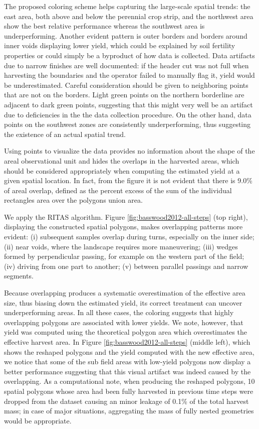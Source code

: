  The proposed coloring scheme helps
capturing the large-scale spatial trends: the east area, both above
and below the perennial crop strip, and the northwest area show the
best relative performance whereas the southwest area is
underperforming. Another evident pattern is outer borders and borders
around inner voids displaying lower yield, which could be explained by
soil fertility properties or could simply be a byproduct of how data
is collected. Data artifacts due to narrow finishes are well
documented: if the header cut was not full when harvesting the
boundaries and the operator failed to manually flag it, yield would be
underestimated. Careful consideration should be given to neighboring
points that are not on the borders. Light green points on the northern
borderline are adjacent to dark green points, suggesting that this
might very well be an artifact due to deficiencies in the the data
collection procedure. On the other hand, data points on the southwest
zones are consistently underperforming, thus suggesting the existence
of an actual spatial trend.

 Using points to visualize the data
provides no information about the shape of the areal observational
unit and hides the overlaps in the harvested areas, which should be
considered appropriately when computing the estimated yield at a given
spatial location. In fact, from the figure it is not evident that
there is 9.0\% of areal overlap, defined as the percent excess of the
sum of the individual rectangles area over the polygons union area.

 We apply the RITAS algorithm. Figure
\ref{fig:basswood2012-all-steps} (top right), displaying the
constructed spatial polygons, makes overlapping patterns more evident:
(i) subsequent samples overlap during turns, especially on the inner
side; (ii) near voids, where the landscape requires more maneuvering;
(iii) wedges formed by perpendicular passing, for example on the
western part of the field; (iv) driving from one part to another; (v)
between parallel passings and narrow segments.

 Because overlapping produces a systematic
overestimation of the effective area size, thus biasing down the
estimated yield, its correct treatment can uncover underperforming
areas. In all these cases, the coloring suggests that highly
overlapping polygons are associated with lower yields. We note,
however, that yield was computed using the theoretical polygon area
which overestimates the effective harvest area. In Figure
\ref{fig:basswood2012-all-steps} (middle left), which shows the
reshaped polygons and the yield computed with the new effective area,
we notice that some of the sub field areas with low-yield polygons now
display a better performance suggesting that this visual artifact was
indeed caused by the overlapping. As a computational note, when
producing the reshaped polygons, 10 spatial polygons whose area had
been fully harvested in previous time steps were dropped from the
dataset causing an minor leakage of 0.1\% of the total harvest mass;
in case of major situations, aggregating the mass of fully nested
geometries would be appropriate.

